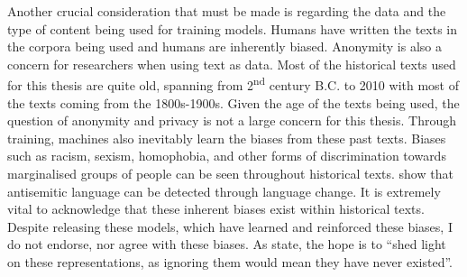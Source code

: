 Another crucial consideration that must be made is regarding the data and the type of content being used for training models. Humans have written the texts in the corpora being used and humans are inherently biased. Anonymity is also a concern for researchers when using text as data. Most of the historical texts used for this thesis are quite old, spanning from 2\textsuperscript{nd} century B.C. to 2010 with most of the texts coming from the 1800s-1900s. Given the age of the texts being used, the question of anonymity and privacy is not a large concern for this thesis. Through training, machines also inevitably learn the biases from these past texts. Biases such as racism, sexism, homophobia, and other forms of discrimination towards marginalised groups of people can be seen throughout historical texts. \citet{tripodi-etal-2019-tracing} show that antisemitic language can be detected through language change. It is extremely vital to acknowledge that these inherent biases exist within historical texts. Despite releasing these models, which have learned and reinforced these biases, I do not endorse, nor agree with these biases. As \citet{hengchen-tahmasebi_2021-swedishdiachronic} state, the hope is to “shed light on these representations, as ignoring them would mean they have never existed”. 
